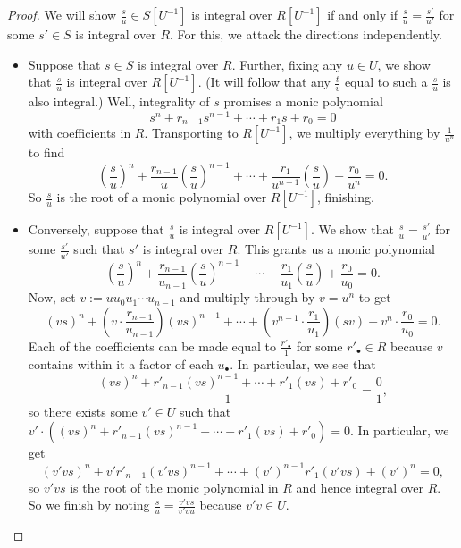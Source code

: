 \begin{proof}
	We will show $\frac su\in S\left[U^{-1}\right]$ is integral over $R\left[U^{-1}\right]$ if and only if $\frac su=\frac{s'}{u'}$ for some $s'\in S$ is integral over $R$. For this, we attack the directions independently.
	\begin{itemize}
		\item Suppose that $s\in S$ is integral over $R$. Further, fixing any $u\in U$, we show that $\frac su$ is integral over $R\left[U^{-1}\right]$. (It will follow that any $\frac tv$ equal to such a $\frac su$ is also integral.) Well, integrality of $s$ promises a monic polynomial
		\[s^n+r_{n-1}s^{n-1}+\cdots+r_1s+r_0=0\]
		with coefficients in $R$. Transporting to $R\left[U^{-1}\right]$, we multiply everything by $\frac1{u^n}$ to find
		\[\left(\frac su\right)^n+\frac{r_{n-1}}u\left(\frac su\right)^{n-1}+\cdots+\frac{r_1}{u^{n-1}}\left(\frac su\right)+\frac{r_0}{u^n}=0.\]
		So $\frac su$ is the root of a monic polynomial over $R\left[U^{-1}\right]$, finishing.
		\item Conversely, suppose that $\frac su$ is integral over $R\left[U^{-1}\right]$. We show that $\frac su=\frac{s'}{u'}$ for some $\frac{s'}{u'}$ such that $s'$ is integral over $R$. This grants us a monic polynomial
		\[\left(\frac su\right)^n+\frac{r_{n-1}}{u_{n-1}}\left(\frac su\right)^{n-1}+\cdots+\frac{r_1}{u_1}\left(\frac su\right)+\frac{r_0}{u_0}=0.\]
		Now, set $v:=uu_0u_1\cdots u_{n-1}$ and multiply through by $v=u^n$ to get
		\[(vs)^n+\left(v\cdot\frac{r_{n-1}}{u_{n-1}}\right)(vs)^{n-1}+\cdots+\left(v^{n-1}\cdot\frac{r_1}{u_1}\right)(sv)+v^n\cdot\frac{r_0}{u_0}=0.\]
		Each of the coefficients can be made equal to $\frac{r'_\bullet}1$ for some $r'_\bullet\in R$ because $v$ contains within it a factor of each $u_\bullet$. In particular, we see that
		\[\frac{(vs)^n+r'_{n-1}(vs)^{n-1}+\cdots+r'_1(vs)+r'_0}1=\frac01,\]
		so there exists some $v'\in U$ such that $v'\cdot\left((vs)^n+r'_{n-1}(vs)^{n-1}+\cdots+r'_1(vs)+r'_0\right)=0$. In particular, we get
		\[(v'vs)^n+v'r'_{n-1}(v'vs)^{n-1}+\cdots+(v')^{n-1}r'_1(v'vs)+(v')^n=0,\]
		so $v'vs$ is the root of the monic polynomial in $R$ and hence integral over $R$. So we finish by noting $\frac su=\frac{v'vs}{v'vu}$ because $v'v\in U$.
		\qedhere
	\end{itemize}
\end{proof}

